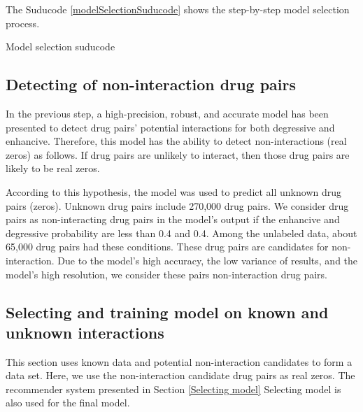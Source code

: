 \documentclass{bmcart}
\begin{document}
The Suducode \ref{modelSelectionSuducode} shows the step-by-step model selection process.

\renewcommand{\algorithmicrequire}{\textbf{Input:}}
\renewcommand{\algorithmicensure}{\textbf{Output:}}
\begin{algorithm}[!h]
\caption{Model selection suducode}
\label{modelSelectionSuducode}
\end{algorithm}


\subsection*{Detecting of non-interaction drug pairs}
In the previous step, a high-precision, robust, and accurate model has been presented to detect drug pairs' potential interactions for both degressive and enhancive. Therefore, this model has the ability to detect non-interactions (real zeros) as follows. If drug pairs are unlikely to interact, then those drug pairs are likely to be real zeros.

According to this hypothesis, the model was used to predict all unknown drug pairs (zeros). Unknown drug pairs include 270,000 drug pairs. We consider drug pairs as non-interacting drug pairs in the model's output if the enhancive and degressive probability are less than 0.4 and 0.4. Among the unlabeled data, about 65,000 drug pairs had these conditions. These drug pairs are candidates for non-interaction. Due to the model's high accuracy, the low variance of results, and the model's high resolution, we consider these pairs non-interaction drug pairs.

\subsection*{Selecting and training model on known and unknown interactions}
This section uses known data and potential non-interaction candidates to form a data set. Here, we use the non-interaction candidate drug pairs as real zeros. The recommender system presented in Section \ref{Selecting model}
Selecting model
is also used for the final model.
\end{document}
